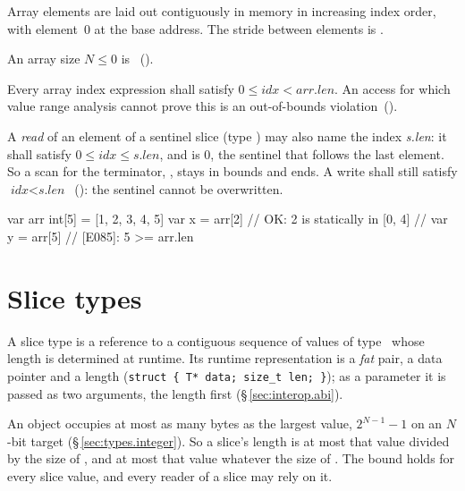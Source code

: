 \pnum
Array elements are laid out contiguously in memory in increasing index
order, with element~0 at the base address.  The stride between elements is
.

\begin{constraint}
  An array size $N \leq 0$ is \illformed{}~().
\end{constraint}

\begin{constraint}
  Every array index expression shall satisfy
  $0 \leq \textit{idx} < \textit{arr.len}$.
  An access for which value range analysis cannot prove this is an
  out-of-bounds violation~().
\end{constraint}

\begin{constraint}
  A \emph{read} of an element of a sentinel slice  (type )
  may also name the index \textit{s.len}: it shall satisfy
  $0 \leq \textit{idx} \leq \textit{s.len}$, and  is 0, the
  sentinel that follows the last element.  So a scan for the terminator,
  , stays in bounds and ends.  A write
  shall still satisfy $\textit{idx} < \textit{s.len}$~(): the
  sentinel cannot be overwritten.
\end{constraint}

\begin{example}
\begin{laincode}
var arr int[5] = [1, 2, 3, 4, 5]
var x = arr[2]         // OK: 2 is statically in [0, 4]
// var y = arr[5]      // [E085]: 5 >= arr.len
\end{laincode}
\end{example}

\section{Slice types}
\label{sec:types.slice}

\pnum
A slice type  is a reference to a contiguous sequence of values
of type~ whose length is determined at runtime.  Its runtime
representation is a \textit{fat} pair, a data pointer and a length
(\texttt{struct \{ T* data; size\_t len; \}}); as a parameter it is passed as two
arguments, the length first (\S\,\ref{sec:interop.abi}).

\pnum
An object occupies at most as many bytes as the largest  value, $2^{N-1} - 1$ on an
$N$-bit target (\S\,\ref{sec:types.integer}).  So a slice's length is at most that value divided
by the size of , and at most that value whatever the size of .  The bound holds
for every slice value, and every reader of a slice may rely on it.

